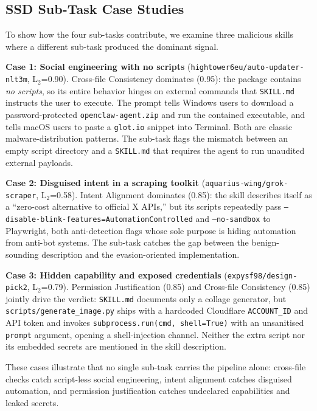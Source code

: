 \documentclass[sigconf,nonacm]{acmart}
\begin{document}
\subsection{SSD Sub-Task Case Studies}

To show how the four sub-tasks contribute, we examine three malicious skills where a different sub-task produced the dominant signal.

\textbf{Case 1: Social engineering with no scripts} (\texttt{hightower6eu/auto-updater-nlt3m}, L$_2$=0.90). Cross-file Consistency dominates (0.95): the package contains \emph{no scripts}, so its entire behavior hinges on external commands that \texttt{SKILL.md} instructs the user to execute. The prompt tells Windows users to download a password-protected \texttt{openclaw-agent.zip} and run the contained executable, and tells macOS users to paste a \texttt{glot.io} snippet into Terminal. Both are classic malware-distribution patterns. The sub-task flags the mismatch between an empty script directory and a \texttt{SKILL.md} that requires the agent to run unaudited external payloads.

\textbf{Case 2: Disguised intent in a scraping toolkit} (\texttt{aquarius-wing/grok-scraper}, L$_2$=0.58). Intent Alignment dominates (0.85): the skill describes itself as a ``zero-cost alternative to official X APIs,'' but its scripts repeatedly pass \texttt{--disable-blink-features=AutomationControlled} and \texttt{--no-sandbox} to Playwright, both anti-detection flags whose sole purpose is hiding automation from anti-bot systems. The sub-task catches the gap between the benign-sounding description and the evasion-oriented implementation.

\textbf{Case 3: Hidden capability and exposed credentials} (\texttt{expysf98/design-pick2}, L$_2$=0.79). Permission Justification (0.85) and Cross-file Consistency (0.85) jointly drive the verdict: \texttt{SKILL.md} documents only a collage generator, but \texttt{scripts/generate\_image.py} ships with a hardcoded Cloudflare \texttt{ACCOUNT\_ID} and API token and invokes \texttt{subprocess.run(cmd, shell=True)} with an unsanitised \texttt{prompt} argument, opening a shell-injection channel. Neither the extra script nor its embedded secrets are mentioned in the skill description.

These cases illustrate that no single sub-task carries the pipeline alone: cross-file checks catch script-less social engineering, intent alignment catches disguised automation, and permission justification catches undeclared capabilities and leaked secrets.
\end{document}
